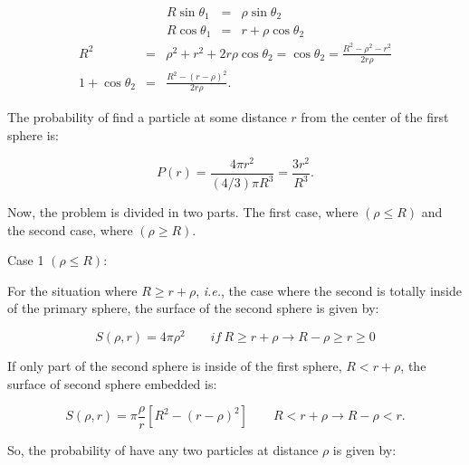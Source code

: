 \begin{eqnarray}
R\sin\theta_{1} & = & \rho\sin\theta_{2} \nonumber\\
R\cos\theta_{1} & = & r+\rho\cos\theta_{2}
\end{eqnarray}
\begin{eqnarray}
R^{2}& = & \rho^{2}+r^{2}+2r\rho\cos\theta_{2}=\cos\theta_{2}=\frac{R^{2}-\rho^{2}-r^{2}}{2r\rho}\\
1+\cos\theta_{2}&=&\frac{R^{2}-\left(r-\rho\right)^{2}}{2r\rho}.
\end{eqnarray}

The probability of find a particle at some distance $r$ from the center of the first sphere is:

\begin{equation}
P\left(r\right)=\frac{4\pi r^2}{\left(4/3\right)\pi R^{3}}=\frac{3r^2}{R^3}.
\end{equation}

Now, the problem is divided in two parts. The first case, where $\left(\rho\leq R\right)$ and the second case, where $\left(\rho\geq R\right)$.

Case 1 $\left(\rho\leq R\right)$:

For the situation where $R\geq r + \rho$, \textit{i.e.}, the case where the second is totally inside of the primary sphere, the surface of the second sphere is given by: 

\begin{equation}
S\left(\rho,r\right)=4\pi\rho^{2}\qquad if\ R\geq r+\rho\rightarrow R-\rho\geq r\geq 0 \nonumber
\end{equation}

If only part of the second sphere is inside of the first sphere, $R<r+\rho$, the surface of second sphere embedded is:

\begin{equation}
S\left(\rho,r\right)=\pi\frac{\rho}{r}\left[R^{2}-\left(r-\rho\right)^{2}\right]\qquad R<r+\rho\rightarrow R-\rho<r.
\end{equation}

So, the probability of have any two particles at distance $\rho$ is given by:

